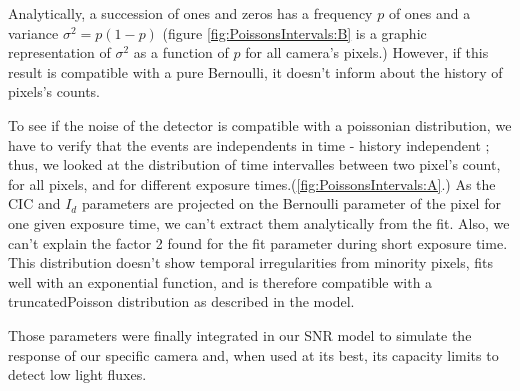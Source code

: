 %


Analytically, a succession of ones and zeros has a frequency $p$ of ones and a variance $\sigma^2 = p(1-p)$ (figure \ref{fig:PoissonsIntervals:B} is a graphic representation of  $\sigma^2$ as a function of $p$ for all camera's pixels.) 
However, if this result is compatible with a pure Bernoulli, it doesn't inform about the history of pixels's counts.\par
To see if the noise of the detector is compatible with a poissonian distribution, we have to verify that the events are independents in time - history independent ; thus, we looked at the distribution of time intervalles between two pixel's count, for all pixels, and for different exposure times.(\ref{fig:PoissonsIntervals:A}.) 
As the CIC and $I_{d}$ parameters are projected on the Bernoulli parameter of the pixel for one given exposure time,  we can't extract them analytically from the fit. Also, we can't explain the factor 2 found for the fit parameter during short exposure time.  This distribution doesn't show temporal irregularities from minority pixels, fits well with an exponential function, and is therefore compatible with a truncatedPoisson distribution as described in the model. \par

Those parameters were finally integrated in our SNR model to simulate the response of our specific camera and, when used at its best, its capacity limits to detect low light fluxes.


%



